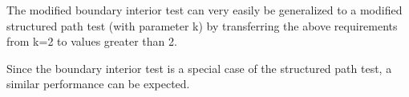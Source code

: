 	The modified boundary interior test can very easily be generalized to a modified structured path test (with parameter k) by transferring the above requirements from k=2 to values greater than 2.

	Since the boundary interior test is a special case of the structured path test, a similar performance can be expected.


	
	
	
	
